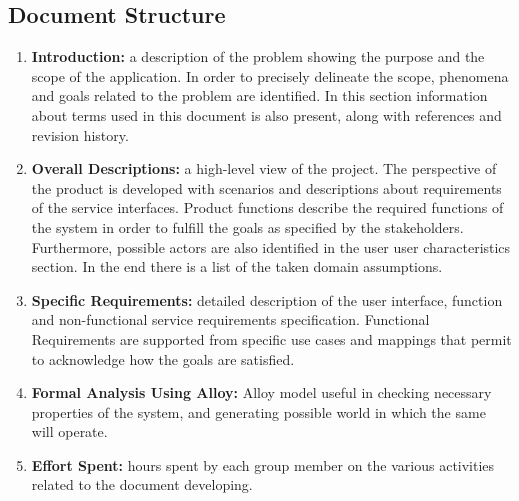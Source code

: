 \subsection{Document Structure}
\begin{enumerate}
    \item \textbf{Introduction:} a description of the problem showing the purpose and the scope of the application. In order to precisely delineate the scope, phenomena and goals related to the problem are identified. In this section information about terms used in this document is also present, along with references and revision history.
    \item \textbf{Overall Descriptions:} a high-level view of the project. The perspective of the product is developed with scenarios and descriptions about requirements of the service interfaces. Product functions describe the required functions of the system in order to fulfill the goals as specified by the stakeholders. Furthermore, possible actors are also identified in the user user characteristics section. In the end there is a list of the taken domain assumptions.
    \item \textbf{Specific Requirements:} detailed description of the user interface, function and non-functional service requirements specification. Functional Requirements are supported from specific use cases and mappings that permit to acknowledge how the goals are satisfied.
    \item \textbf{Formal Analysis Using Alloy:} Alloy model useful in checking necessary properties of the system, and generating possible world in which the same will operate.
    \item \textbf{Effort Spent:} hours spent by each group member on the various activities related to the document developing.
\end{enumerate}
